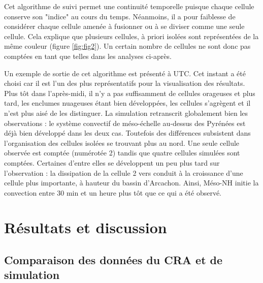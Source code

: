 \documentclass[12pt]{article}
\begin{document}
\begin{multicols}{2}

Cet algorithme de suivi permet une continuité temporelle puisque chaque cellule conserve son "indice" au cours du temps. Néanmoins, il a pour faiblesse de considérer chaque cellule amenée à fusionner ou à se diviser comme une seule cellule. Cela explique que plusieurs cellules, à priori isolées sont représentées de la même couleur (figure \ref{fig:fig2}). Un certain nombre de cellules ne sont donc pas comptées en tant que telles dans les analyses ci-après.

Un exemple de sortie de cet algorithme est présenté à  UTC. Cet instant a été choisi car il est l'un des plus représentatifs pour la visualisation des résultats. Plus tôt dans l'après-midi, il n'y a pas suffisamment de cellules orageuses et plus tard, les enclumes nuageuses étant bien développées, les cellules s’agrègent et il n'est plus aisé de les distinguer. La simulation retranscrit globalement bien les observations : le système convectif de méso-échelle au-dessus des Pyrénées est déjà bien développé dans les deux cas. Toutefois des différences subsistent dans l'organisation des cellules isolées se trouvant plus au nord. Une seule cellule observée est comptée (numérotée 2) tandis que quatre cellules simulées sont comptées. Certaines d'entre elles se développent un peu plus tard sur l'observation : la dissipation de la cellule 2 vers  conduit à la croissance d'une cellule plus importante, à hauteur du bassin d'Arcachon. Ainsi, Méso-NH initie la convection entre 30 min et un heure plus tôt que ce qui a été observé.

\vspace{-3mm}

\section{Résultats et discussion}

\subsection{Comparaison des données du CRA et de simulation}


\end{multicols}
\end{document}
